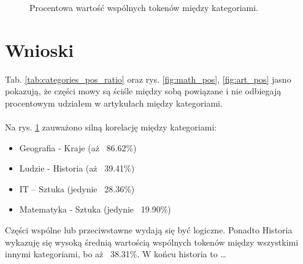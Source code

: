 \documentclass{article}
\begin{document}
\begin{figure}[H]
    \centering
    \caption{Procentowa wartość wspólnych tokenów między kategoriami.}
    \label{fig:common_tokens}
\end{figure}

\section{Wnioski}

Tab. \ref{tab:categories_pos_ratio} oraz rys. \ref{fig:math_pos}, \ref{fig:art_pos} jasno pokazują, że części mowy są ściśle między sobą powiązane i nie odbiegają procentowym udziałem w artykułach
między kategoriami. 

\paragraph{}
Na rys. \ref{fig:common_tokens} zauważono silną korelację między kategoriami:
\begin{itemize}
    \item Geografia - Kraje (aż ~86.62\%)
    \item Ludzie - Historia (aż ~39.41\%)
    \item IT -- Sztuka (jedynie ~28.36\%)
    \item Matematyka - Sztuka (jedynie ~19.90\%)
\end{itemize}

Części wspólne lub przeciwstawne wydają się być logiczne. Ponadto Historia wykazuję się wysoką średnią wartością wspólnych tokenów między wszystkimi innymi kategoriami, bo aż ~38.31\%. W końcu historia to
\ldots
\end{document}
